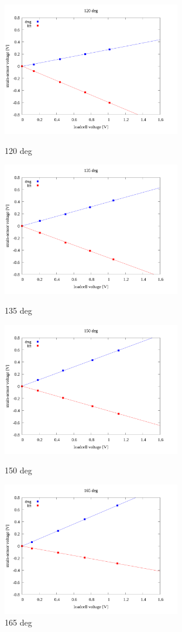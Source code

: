 \documentclass[twocolumn,a4j]{jsarticle}
\begin{document}
\par
\newpage

\begin{figure}[htbp]
    \footnotesize
    \begin{center}
        \includegraphics[width=78mm]{../images/linear/120_linear.png}
        \caption{120 deg}
        \includegraphics[width=78mm]{../images/linear/135_linear.png}
        \caption{135 deg}
        \includegraphics[width=78mm]{../images/linear/150_linear.png}
        \caption{150 deg}
        \includegraphics[width=78mm]{../images/linear/165_linear.png}
        \caption{165 deg}
    \end{center}
\end{figure}
\end{document}
